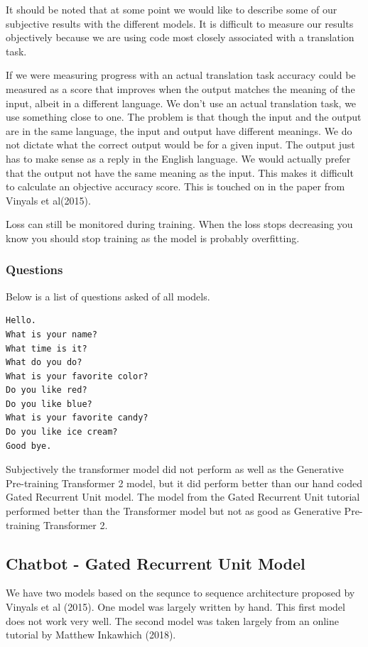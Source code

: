 It should be noted that at some point we would like to describe some of our subjective results with the different models. It is difficult to measure our results objectively because we are using code most closely associated with a translation task. 

If we were measuring progress with an actual translation task accuracy could be measured as a score that improves when the output matches the meaning of the input, albeit in a different language. We don't use an actual translation task, we use something close to one. The problem is that though the input and the output are in the same language, the input and output have different meanings. We do not dictate what the correct output would be for a given input. The output just has to make sense as a reply in the English language. We would actually prefer that the output not have the same meaning as the input. This makes it difficult to calculate an objective accuracy score. This is touched on in the paper from Vinyals et al(2015)\cite{DBLP:journals/corr/VinyalsL15}.

Loss can still be monitored during training. When the loss stops decreasing you know you should stop training as the model is probably overfitting.

\subsubsection*{Questions}
Below is a list of questions asked of all models.

\begin{verbatim}
Hello.
What is your name? 
What time is it?
What do you do?
What is your favorite color?
Do you like red?
Do you like blue?
What is your favorite candy?
Do you like ice cream?
Good bye.
\end{verbatim}

Subjectively the transformer model did not perform as well as the Generative Pre-training Transformer 2 model, but it did perform better than our hand coded Gated Recurrent Unit model. The model from the Gated Recurrent Unit tutorial performed better than the Transformer model but not as good as Generative Pre-training Transformer 2.


\subsection{Chatbot - Gated Recurrent Unit Model}
We have two models based on the sequnce to sequence architecture proposed by Vinyals et al (2015)\cite{DBLP:journals/corr/VinyalsL15}. One model was largely written by hand. This first model does not work very well. The second model was taken largely from an online tutorial by Matthew Inkawhich (2018)\cite{2018Inkawhich}.

